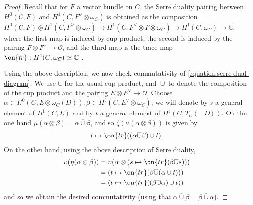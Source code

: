\begin{proof}
	Recall that for $F$ a vector bundle on $C$, the Serre duality pairing
	between $H^0(C, F)$ and $H^1(C, F^\vee\otimes \omega_C)$ is obtained
	as the composition $H^0(C, F) \otimes H^1(C, F^\vee\otimes \omega_C) \to
	H^1(C, F^\vee\otimes F \otimes \omega_C) \to
	H^1(C, \omega_C) \to \mathbb C$, where
	the first map is induced by cup product, the second is induced by the
	pairing
	$F \otimes F^\vee \to \mathscr O$,
	and the third map is the trace
	map $\on{tr}: H^1(C, \omega_C) \simeq \mathbb C$
	\cite[30.3.15]{vakil:foundations-of-algebraic-geometry-2017}.

	Using the above description, we now check commutativity of
	\eqref{equation:serre-dual-diagram}.
	We use $\cup$ for the usual cup product, and $\overline{\cup}$ to denote
	the composition of the cup product and the pairing $E \otimes E^\vee \to
	\mathscr O$.
		Choose $\alpha \in H^0(C, E \otimes \omega_C(D)), \beta \in
	H^0(C, E^\vee \otimes \omega_C)$; we will denote by $s$ a general element of $H^1(C, E)$ and by $t$ a general element of $H^1(C,
	T_C(-D))$.
	On the one hand $\mu(\alpha \otimes \beta) = \alpha \overline{\cup}\beta$, and so $\zeta(\mu(\alpha\otimes \beta))$ is given by $$t\mapsto \on{tr}((\alpha\overline{\cup}\beta)\cup t).$$
	On the other hand, using the above description of Serre duality,
	\begin{align*}
		\upsilon(\eta(\alpha \otimes \beta))
		&= \upsilon(\alpha \otimes (s \mapsto \on{tr}(\beta
		\overline{\cup}s)))
		\\
		&= \left(t \mapsto \on{tr}(\beta \overline{\cup} (\alpha \cup
			t))\right) \\
			&= \left( t \mapsto \on{tr}( (\beta \overline{\cup} \alpha) \cup
			t )\right)
	\end{align*}
	and so we obtain the desired commutativity (using that $\alpha \overline{\cup} \beta = \beta \overline{\cup} \alpha$).

\end{proof}
